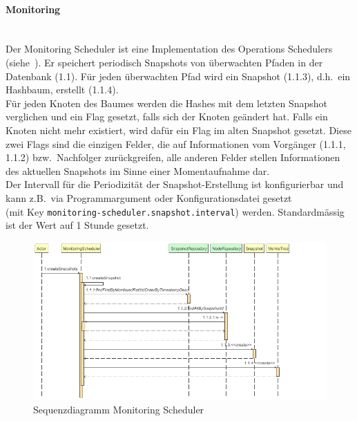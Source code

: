 \documentclass[a4paper,12pt]{report}
\begin{document}
    \paragraph*{Monitoring}
    \\Der Monitoring Scheduler ist eine Implementation des Operations Schedulers (siehe~).
    Er speichert periodisch Snapshots von überwachten Pfaden in der Datenbank (1.1).
    Für jeden überwachten Pfad wird ein Snapshot (1.1.3), d.h.\ ein Hashbaum, erstellt (1.1.4).\\
    Für jeden Knoten des Baumes werden die Hashes mit dem letzten Snapshot verglichen und ein Flag gesetzt, falls sich der Knoten geändert hat.
    Falls ein Knoten nicht mehr existiert, wird dafür ein Flag im alten Snapshot gesetzt.
    Diese zwei Flags sind die einzigen Felder, die auf Informationen vom Vorgänger (1.1.1, 1.1.2) bzw.\ Nachfolger zurückgreifen,
    alle anderen Felder stellen Informationen des aktuellen Snapshots im Sinne einer Momentaufnahme dar.
    \\Der Intervall für die Periodizität der Snapshot-Erstellung ist konfigurierbar und kann z.B.\ via Programmargument oder Konfigurationsdatei gesetzt
    \\(mit Key \texttt{monitoring-scheduler.snapshot.interval}) werden.
    Standardmässig ist der Wert auf 1 Stunde gesetzt.
    \begin{figure}
        \centering
        \includegraphics[width=1\textwidth]{assets/MonitoringScheduler_createSnapshots_seq_diag}
        \caption{Sequenzdiagramm Monitoring Scheduler}
        \label{fig:seq-diag-monitoring-scheduler}
    \end{figure}

    \clearpage
\end{document}
